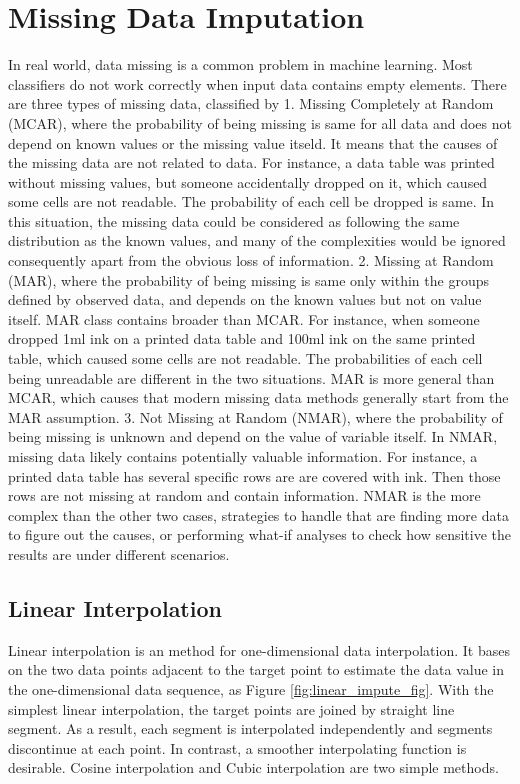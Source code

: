 \documentclass[12pt,a4paper,english
]{tunithesis}
\begin{document}
\section{Missing Data Imputation}
In real world, data missing is a common problem in machine learning. Most classifiers do not work correctly when input data contains empty elements.
There are three types of missing data, classified by \textcite{rubin1976}
1. Missing Completely at Random (MCAR), where the probability of being missing is same for all data and does not depend on known values or the missing value itseld. It means that the causes of the missing data are not related to data. For instance, a data table was printed without missing values, but someone accidentally dropped on it, which caused some cells are not readable. The probability of each cell be dropped is same. In this situation, the missing data could be considered as following the same distribution as the known values, and many of the complexities would be ignored consequently apart from the obvious loss of information.
2. Missing at Random (MAR), where the probability of being missing is same only within the groups defined by observed data, and depends on the known values but not on value itself. MAR class contains broader than MCAR. For instance, when someone dropped 1ml ink on a printed data table and 100ml ink on the same printed table, which caused some cells are not readable. The probabilities of each cell being unreadable are different in the two situations. MAR is more general than MCAR, which causes that modern missing data methods generally start from the MAR assumption.
3. Not Missing at Random (NMAR), where the probability of being missing is unknown and depend on the value of variable itself. In NMAR, missing data likely contains potentially valuable information. For instance, a printed data table has several specific rows are are covered with ink. Then those rows are not missing at random and contain information. NMAR is the more complex than the other two cases, strategies to handle that are finding more data to figure out the causes, or performing what-if analyses to check how sensitive the results are under different scenarios. \parencite{vanbuuren2018}
\subsection{Linear Interpolation}
Linear interpolation is an method for one-dimensional data interpolation. It bases on the two data points adjacent to the target point to estimate the data value in the one-dimensional data sequence, as Figure \ref{fig:linear_impute_fig}. With the simplest linear interpolation, the target points are joined by straight line segment. As a result, each segment is interpolated independently and segments discontinue at each point. \parencite{huang2021, paul1999}
In contrast, a smoother interpolating function is desirable. Cosine interpolation and Cubic interpolation are two simple methods.
\end{document}
